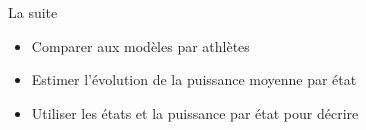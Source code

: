 \documentclass{beamer}
\begin{document}
\begin{frame}{La suite}
    \begin{itemize}
        \item Comparer aux modèles par athlètes
        \item Estimer l'évolution de la puissance moyenne par état
        \item Utiliser les états et la puissance par état pour décrire
    \end{itemize}
\end{frame}
\end{document}
